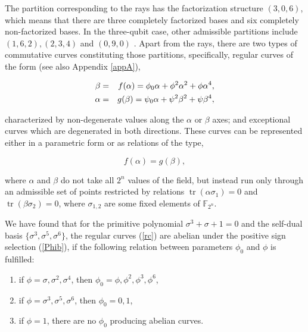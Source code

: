 \documentclass[quantumrep,article,submit,pdftex,moreauthors]{Definitions/mdpi}
\DeclareMathOperator{\tr}{tr}
\begin{document}
The partition corresponding to the rays has the factorization structure
$(3,0,6)$, which means that there are three completely factorized bases and six
completely non-factorized bases. In the three-qubit case, other admissible
partitions include $(1,6,2),(2,3,4)$ and $(0,9,0)$ \cite{factor1,factor2}.
Apart from the rays, there are two types of commutative curves constituting
those partitions, specifically, regular curves of the form \cite{GS2} (see also
Appendix \ref{appA}),

\begin{eqnarray}
  \beta
  &=& f(\alpha) = \phi_{0}\alpha +\phi^{2} \alpha^{2} + \phi \alpha^{4},
  \label{rc} \\
  \alpha
  &=& g(\beta) = \psi_{0}\alpha +\psi^{2} \beta^{2} + \psi \beta^{4},
  \notag
\end{eqnarray}

characterized by non-degenerate values along the $\alpha$ or $\beta$ axes; and
exceptional curves which are degenerated in both directions. These curves can be
represented either in a parametric form or as relations of the type,

\begin{equation*}
  f(\alpha) = g(\beta),
\end{equation*}

where $\alpha$ and $\beta$ do not take all $2^{n}$ values of the field, but
instead run only through an admissible set of points restricted by relations
$\tr(\alpha \sigma_{1}) = 0$ and $\tr(\beta \sigma_{2}) = 0$, where
$\sigma_{1,2}$ are some fixed elements of $\mathbb{F}_{2^{n}}$.

We have found that for the primitive polynomial $\sigma^{3} + \sigma + 1 = 0$
and the self-dual basis $\{\sigma^{3},\sigma^{5},\sigma^{6}\}$, the regular
curves (\ref{rc}) are abelian under the positive sign selection (\ref{Phib}), if
the following relation between parameters $\phi_{0}$ and $\phi$ is fulfilled:

\begin{enumerate}
  \item if $\phi =\sigma, \sigma^{2}, \sigma^{4}$, then $\phi_{0} =
    \phi,\phi^{2},\phi^{3}, \phi^{6}$,

  \item if $\phi = \sigma^{3}, \sigma^{5}, \sigma^{6}$, then $\phi_{0}=0,1$,

  \item if $\phi = 1$, there are no $\phi_{0}$ producing abelian curves.
\end{enumerate}
\end{document}
